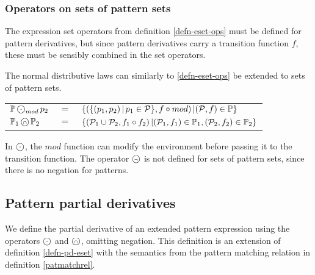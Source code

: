 \subsubsection{Operators on sets of pattern sets}

The expression set operators from definition \ref{defn-eset-ops} must be defined
for pattern derivatives, but since pattern derivatives carry a transition
function $f$, these must be sensibly combined in the set operators.

\begin{defn}
   \label{defn-pset-ops}
   The normal distributive laws can similarly to \ref{defn-eset-ops} be extended
   to sets of pattern sets.

   \begin{tabular}{lll}
      $\psets \circledcdot_{mod} p_2$
         & $=$
         & $\{ (\{ (p_1, p_2) \operatorname{|} p_1 \in \mathcal{P} \}, f \circ mod) \operatorname{|} (\mathcal{P}, f) \in \mathbb{P} \}$
         \\

      $\mathbb{P}_1 \operatorname{\text{\textcircled{\tiny$\cap$}}} \mathbb{P}_2$
         & $=$
         & $\{
              (\mathcal{P}_1 \cup \mathcal{P}_2, f_1 \circ f_2)
              \operatorname{|} (\mathcal{P}_1, f_1) \in \mathbb{P}_1, (\mathcal{P}_2, f_2) \in \mathbb{P}_2
           \}$
         \\
   \end{tabular}
\end{defn}

In $\circledcdot$, the $mod$ function can modify the environment before passing
it to the transition function.  The operator $\operatorname{\text{\textcircled{\tiny$\neg$}}}$ is not defined for
sets of pattern sets, since there is no negation for patterns.


\subsection{Pattern partial derivatives}

We define the partial derivative of an extended pattern expression using the
operators $\circledcdot$ and $\operatorname{\text{\textcircled{\tiny$\cap$}}}$, omitting negation. This definition
is an extension of definition \ref{defn-pd-eset} with the semantics from the
pattern matching relation in definition \ref{patmatchrel}.

